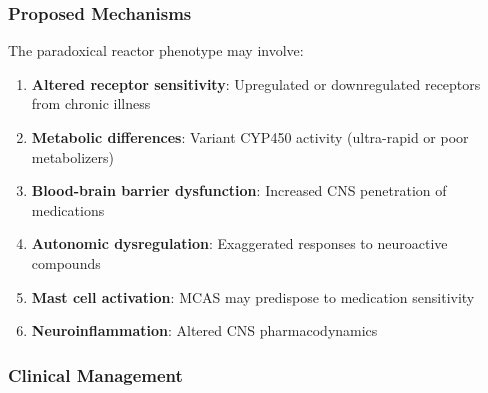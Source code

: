 \subsubsection{Proposed Mechanisms}

The paradoxical reactor phenotype may involve:
\begin{enumerate}
    \item \textbf{Altered receptor sensitivity}: Upregulated or downregulated receptors from chronic illness
    \item \textbf{Metabolic differences}: Variant CYP450 activity (ultra-rapid or poor metabolizers)
    \item \textbf{Blood-brain barrier dysfunction}: Increased CNS penetration of medications
    \item \textbf{Autonomic dysregulation}: Exaggerated responses to neuroactive compounds
    \item \textbf{Mast cell activation}: MCAS may predispose to medication sensitivity
    \item \textbf{Neuroinflammation}: Altered CNS pharmacodynamics
\end{enumerate}

\subsubsection{Clinical Management}

